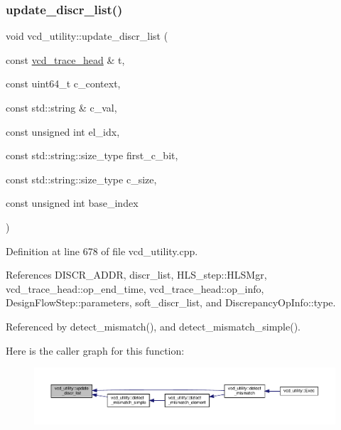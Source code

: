 \subsubsection{\texorpdfstring{update\+\_\+discr\+\_\+list()}{update\_discr\_list()}}
{\footnotesize\ttfamily void vcd\+\_\+utility\+::update\+\_\+discr\+\_\+list (\begin{DoxyParamCaption}\item[{const \hyperlink{structvcd__trace__head}{vcd\+\_\+trace\+\_\+head} \&}]{t,  }\item[{const uint64\+\_\+t}]{c\+\_\+context,  }\item[{const std\+::string \&}]{c\+\_\+val,  }\item[{const unsigned int}]{el\+\_\+idx,  }\item[{const std\+::string\+::size\+\_\+type}]{first\+\_\+c\+\_\+bit,  }\item[{const std\+::string\+::size\+\_\+type}]{c\+\_\+size,  }\item[{const unsigned int}]{base\+\_\+index }\end{DoxyParamCaption})\hspace{0.3cm}{\ttfamily [protected]}}



Definition at line 678 of file vcd\+\_\+utility.\+cpp.



References D\+I\+S\+C\+R\+\_\+\+A\+D\+DR, discr\+\_\+list, H\+L\+S\+\_\+step\+::\+H\+L\+S\+Mgr, vcd\+\_\+trace\+\_\+head\+::op\+\_\+end\+\_\+time, vcd\+\_\+trace\+\_\+head\+::op\+\_\+info, Design\+Flow\+Step\+::parameters, soft\+\_\+discr\+\_\+list, and Discrepancy\+Op\+Info\+::type.



Referenced by detect\+\_\+mismatch(), and detect\+\_\+mismatch\+\_\+simple().

Here is the caller graph for this function\+:
\nopagebreak
\begin{figure}[H]
\begin{center}
\leavevmode
\includegraphics[width=350pt]{d8/d51/classvcd__utility_a5ca871239e451e2e15f8866dfcf2558d_icgraph}
\end{center}
\end{figure}


